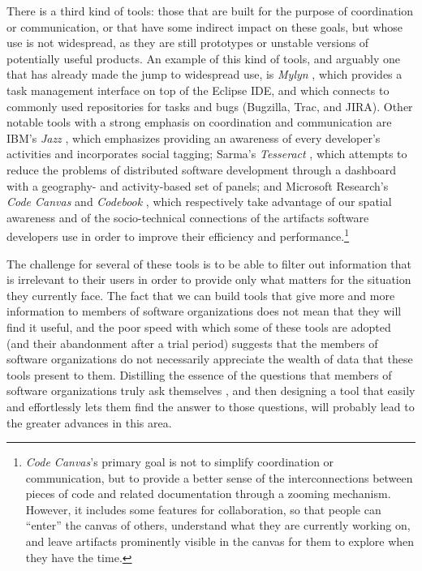 There is a third kind of tools: those that are built for the purpose of coordination or communication, or that have some indirect impact on these goals, but whose use is not widespread, as they are still prototypes or unstable versions of potentially useful products. An example of this kind of tools, and arguably one that has already made the jump to widespread use, is \emph{Mylyn} \cite{Kersten2005}, which provides a task management interface on top of the Eclipse IDE, and which connects to commonly used repositories for tasks and bugs (Bugzilla, Trac, and JIRA). Other notable tools with a strong emphasis on coordination and communication are IBM's \emph{Jazz} \cite{Frost2007}, which emphasizes providing an awareness of every developer's activities and incorporates social tagging; Sarma's \emph{Tesseract} \cite{Sarma2009}, which attempts to reduce the problems of distributed software development through a dashboard with a geography- and activity-based set of panels; and Microsoft Research's \emph{Code Canvas} \cite{DeLine2010} and \emph{Codebook} \cite{Begel2010}, which respectively take advantage of our spatial awareness and of the socio-technical connections of the artifacts software developers use in order to improve their efficiency and performance.\footnote{\emph{Code Canvas}'s primary goal is not to simplify coordination or communication, but to provide a better sense of the interconnections between pieces of code and related documentation through a zooming mechanism. However, it includes some features for collaboration, so that people can ``enter'' the canvas of others, understand what they are currently working on, and leave artifacts prominently visible in the canvas for them to explore when they have the time.}

The challenge for several of these tools is to be able to filter out information that is irrelevant to their users in order to provide only what matters for the situation they currently face. The fact that we can build tools that give more and more information to members of software organizations does not mean that they will find it useful, and the poor speed with which some of these tools are adopted (and their abandonment after a trial period) suggests that the members of software organizations do not necessarily appreciate the wealth of data that these tools present to them. Distilling the essence of the questions that members of software organizations truly ask themselves \cite{Ko2007}, and then designing a tool that easily and effortlessly lets them find the answer to those questions, will probably lead to the greater advances in this area.



